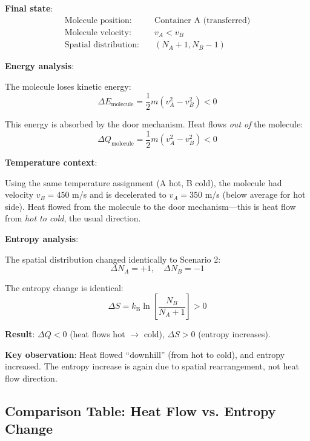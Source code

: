 \documentclass[10pt,twocolumn,letterpaper]{article}
\theoremstyle{definition}
\theoremstyle{remark}
\newcommand{\kb}{k_\text{B}}
\begin{document}
\textbf{Final state}:
\begin{align}
\text{Molecule position:} &\quad \text{Container A (transferred)} \\
\text{Molecule velocity:} &\quad v_A < v_B \\
\text{Spatial distribution:} &\quad (N_A + 1, N_B - 1)
\end{align}

\textbf{Energy analysis}:

The molecule loses kinetic energy:
\begin{equation}
\Delta E_{\text{molecule}} = \frac{1}{2}m(v_A^2 - v_B^2) < 0
\end{equation}

This energy is absorbed by the door mechanism. Heat flows \textit{out of} the molecule:
\begin{equation}
\Delta Q_{\text{molecule}} = \frac{1}{2}m(v_A^2 - v_B^2) < 0
\end{equation}

\textbf{Temperature context}:

Using the same temperature assignment (A hot, B cold), the molecule had velocity $v_B = 450$ m/s and is decelerated to $v_A = 350$ m/s (below average for hot side). Heat flowed from the molecule to the door mechanism—this is heat flow from \textit{hot to cold}, the usual direction.

\textbf{Entropy analysis}:

The spatial distribution changed identically to Scenario 2:
\begin{equation}
\Delta N_A = +1, \quad \Delta N_B = -1
\end{equation}

The entropy change is identical:
\begin{equation}
\Delta S = \kb \ln\left[\frac{N_B}{N_A+1}\right] > 0
\end{equation}

\textbf{Result}: $\Delta Q < 0$ (heat flows hot $\to$ cold), $\Delta S > 0$ (entropy increases).

\textbf{Key observation}: Heat flowed ``downhill'' (from hot to cold), and entropy increased. The entropy increase is again due to spatial rearrangement, not heat flow direction.

\subsection{Comparison Table: Heat Flow vs. Entropy Change}
\end{document}
